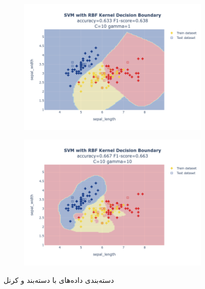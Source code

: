 \documentclass{article}
\begin{document}
\begin{figure}
\begin{subfigure}{0.3\textwidth}
        \includegraphics[scale=.13]{images/implementation/q1/rbf_kernel/sepal_length_sepal_width_10_1.png}
    \end{subfigure}
    \hfill
    \begin{subfigure}{0.3\textwidth}
        \centering
        \includegraphics[scale=.13]{images/implementation/q1/rbf_kernel/sepal_length_sepal_width_10_10.png}
    \end{subfigure}
    \caption{دسته‌بندی داده‌های  با دسته‌بند  و کرنل }
    \label{rbf_kernel}
\end{figure}

\newpage
\end{document}
